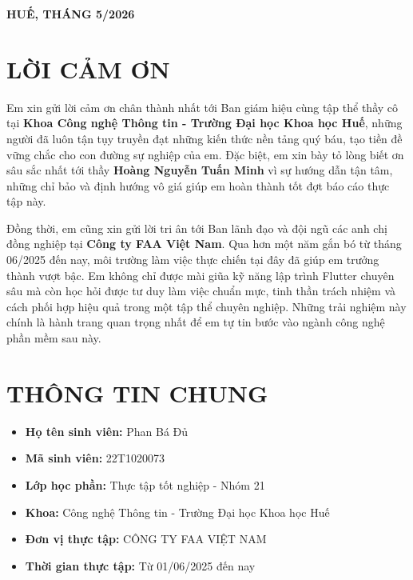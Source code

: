\documentclass[12pt, a4paper]{article}
\begin{document}
\begin{titlepage}
    \vfill
    \begin{center}
        \textbf{HUẾ, THÁNG 5/2026}
    \end{center}
    \restoregeometry
\end{titlepage}

\newpage

\section*{LỜI CẢM ƠN}
Em xin gửi lời cảm ơn chân thành nhất tới Ban giám hiệu cùng tập thể thầy cô tại \textbf{Khoa Công nghệ Thông tin - Trường Đại học Khoa học Huế}, những người đã luôn tận tụy truyền đạt những kiến thức nền tảng quý báu, tạo tiền đề vững chắc cho con đường sự nghiệp của em. Đặc biệt, em xin bày tỏ lòng biết ơn sâu sắc nhất tới thầy \textbf{Hoàng Nguyễn Tuấn Minh} vì sự hướng dẫn tận tâm, những chỉ bảo và định hướng vô giá giúp em hoàn thành tốt đợt báo cáo thực tập này.

Đồng thời, em cũng xin gửi lời tri ân tới Ban lãnh đạo và đội ngũ các anh chị đồng nghiệp tại \textbf{Công ty FAA Việt Nam}. Qua hơn một năm gắn bó từ tháng 06/2025 đến nay, môi trường làm việc thực chiến tại đây đã giúp em trưởng thành vượt bậc. Em không chỉ được mài giũa kỹ năng lập trình Flutter chuyên sâu mà còn học hỏi được tư duy làm việc chuẩn mực, tinh thần trách nhiệm và cách phối hợp hiệu quả trong một tập thể chuyên nghiệp. Những trải nghiệm này chính là hành trang quan trọng nhất để em tự tin bước vào ngành công nghệ phần mềm sau này.

\newpage
\renewcommand{\contentsname}{MỤC LỤC}
\tableofcontents
\newpage


\section{THÔNG TIN CHUNG}
\begin{itemize}
    \item \textbf{Họ tên sinh viên:} Phan Bá Đủ
    \item \textbf{Mã sinh viên:} 22T1020073
    \item \textbf{Lớp học phần:} Thực tập tốt nghiệp - Nhóm 21
    \item \textbf{Khoa:} Công nghệ Thông tin - Trường Đại học Khoa học Huế
    \item \textbf{Đơn vị thực tập:} CÔNG TY FAA VIỆT NAM
    \item \textbf{Thời gian thực tập:} Từ 01/06/2025 đến nay
\end{itemize}
\end{document}
